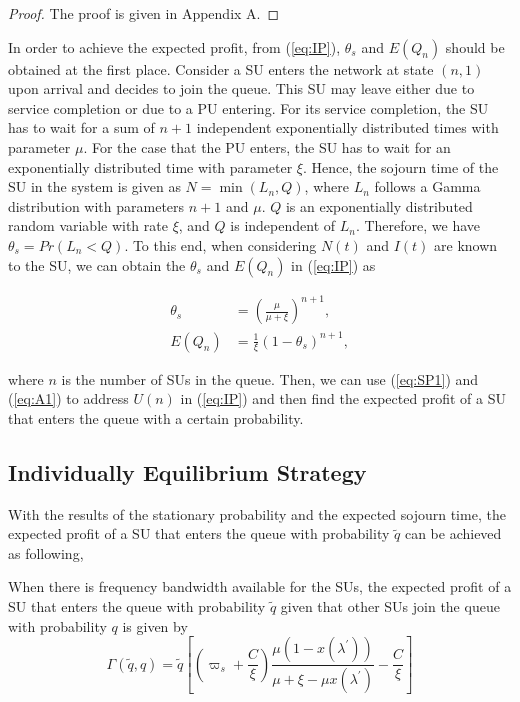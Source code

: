 \documentclass[journal]{IEEEtran}
\begin{document}
\begin{proof}
The proof is given in Appendix A.
\end{proof}

In order to achieve the expected profit, from (\ref{eq:IP}),
$\theta_s$ and $E(Q_n)$ should be obtained at the first place.
Consider a SU enters the network at state $(n, 1)$ upon arrival
and decides to join the queue. This SU may leave either due to
service completion or due to a PU entering. For its service
completion, the SU has to wait for a sum of $n + 1$ independent
exponentially distributed times with parameter $\mu$. For the case
that the PU enters, the SU has to wait for an exponentially distributed
time with parameter $\xi$. Hence, the sojourn time of the SU in the
system is given as $N = \min(L_n, Q)$, where $L_n$ follows a
Gamma distribution with parameters $n+1$ and $\mu$. $Q$ is an
exponentially distributed random variable with rate $\xi$, and $Q$
is independent of $L_n$. Therefore, we have $\theta_s=Pr(L_n <
Q)$. To this end, when considering $N(t)$ and $I(t)$ are known to the SU,  we can obtain the $\theta_s$ and $E(Q_n)$ in
(\ref{eq:IP}) as

\begin{equation}
\begin{split}
\label{eq:A1} \theta_s & = \left(\frac{\mu}{\mu +
\xi}\right)^{n+1}, \\
E(Q_n) & = \frac{1}{\xi}\left( 1 - \theta_s \right)^{n+1},
\end{split}
\end{equation}

\noindent where $n$ is the number of SUs in the queue. Then, we
can use (\ref{eq:SP1}) and (\ref{eq:A1}) to address $U(n)$ in
(\ref{eq:IP}) and then find the expected profit of a SU that enters
the queue with a certain probability.

\subsection{Individually Equilibrium Strategy}

With the results of the stationary probability and the expected
sojourn time, the expected profit of a SU that enters the queue
with probability $\tilde{q}$ can be achieved as following,

\begin{proposition}
When there is frequency bandwidth available for the SUs, the expected
profit of a SU that enters the queue with probability $\tilde{q}$
given that other SUs join the queue with probability $q$ is given
by
\begin{equation}
\label{eq:ProfitExpected}
\Gamma(\tilde{q},q) = \tilde{q}
\left[\left( \varpi_s + \frac{C}{\xi} \right)
\frac{\mu(1-x(\lambda^{'}))}{\mu+\xi-\mu x(\lambda^{'})}-
\frac{C}{\xi}\right]
\end{equation}
\end{proposition}
\end{document}
